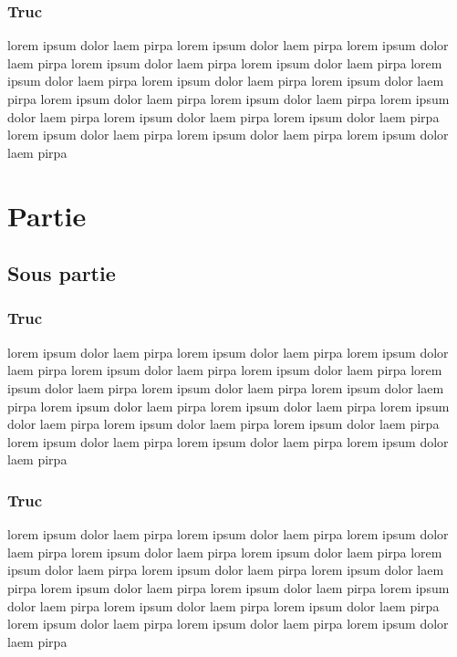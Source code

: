 \documentclass[11pt,fleqn]{book}
\begin{document}
\subsection{Truc}
lorem  ipsum  dolor  laem  pirpa  lorem  ipsum  dolor  laem  pirpa  lorem  ipsum  dolor  laem  pirpa  lorem  ipsum  dolor  laem  pirpa  lorem  ipsum  dolor  laem  pirpa  lorem  ipsum  dolor  laem  pirpa  lorem  ipsum  dolor  laem  pirpa  lorem  ipsum  dolor  laem  pirpa  lorem  ipsum  dolor  laem  pirpa  lorem  ipsum  dolor  laem  pirpa  lorem  ipsum  dolor  laem  pirpa  lorem  ipsum  dolor  laem  pirpa  lorem  ipsum  dolor  laem  pirpa  lorem  ipsum  dolor  laem  pirpa  lorem  ipsum  dolor  laem  pirpa  lorem  ipsum  dolor  laem  pirpa 
~\\
								\chapter{Partie }
\section{Sous partie}
\subsection{Truc}
lorem  ipsum  dolor  laem  pirpa  lorem  ipsum  dolor  laem  pirpa  lorem  ipsum  dolor  laem  pirpa  lorem  ipsum  dolor  laem  pirpa  lorem  ipsum  dolor  laem  pirpa  lorem  ipsum  dolor  laem  pirpa  lorem  ipsum  dolor  laem  pirpa  lorem  ipsum  dolor  laem  pirpa  lorem  ipsum  dolor  laem  pirpa  lorem  ipsum  dolor  laem  pirpa  lorem  ipsum  dolor  laem  pirpa  lorem  ipsum  dolor  laem  pirpa  lorem  ipsum  dolor  laem  pirpa  lorem  ipsum  dolor  laem  pirpa  lorem  ipsum  dolor  laem  pirpa  lorem  ipsum  dolor  laem  pirpa 
~\\
\subsection{Truc}
lorem  ipsum  dolor  laem  pirpa  lorem  ipsum  dolor  laem  pirpa  lorem  ipsum  dolor  laem  pirpa  lorem  ipsum  dolor  laem  pirpa  lorem  ipsum  dolor  laem  pirpa  lorem  ipsum  dolor  laem  pirpa  lorem  ipsum  dolor  laem  pirpa  lorem  ipsum  dolor  laem  pirpa  lorem  ipsum  dolor  laem  pirpa  lorem  ipsum  dolor  laem  pirpa  lorem  ipsum  dolor  laem  pirpa  lorem  ipsum  dolor  laem  pirpa  lorem  ipsum  dolor  laem  pirpa  lorem  ipsum  dolor  laem  pirpa  lorem  ipsum  dolor  laem  pirpa  lorem  ipsum  dolor  laem  pirpa 
~\\
\end{document}

